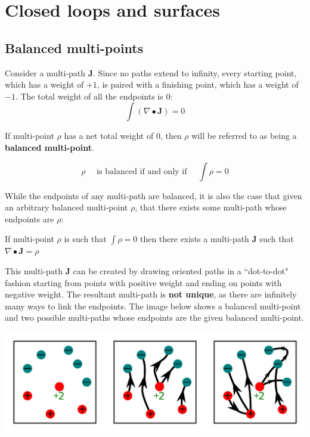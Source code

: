 



\chapter{Closed loops and surfaces}\label{chap:closed_loops_and_surfaces}

\section{Balanced multi-points}\label{sec:balanced_multi-points}

Consider a multi-path \(\mathbf{J}\). Since no paths extend to infinity, every starting point, which has a weight of \(+1\), is paired with a finishing point, which has a weight of \(-1\). The total weight of all the endpoints is \(0\):
\[\int (\nabla \bullet \mathbf{J}) = 0\]

If multi-point \(\rho\) has a net total weight of \(0\), then \(\rho\) will be referred to as being a {\bf balanced multi-point}.

\[\rho \quad\text{ is balanced if and only if }\quad \int \rho = 0\]

While the endpoints of any multi-path are balanced, it is also the case that given an arbitrary balanced multi-point \(\rho\), that there exists some multi-path whose endpoints are \(\rho\):

\begin{thm}\label{thm:dot-to-dot}
If multi-point \(\rho\) is such that \(\int \rho = 0\) then there exists a multi-path \(\mathbf{J}\) such that \(\nabla \bullet \mathbf{J} = \rho\)
\end{thm}

This multi-path \(\mathbf{J}\) can be created by drawing oriented paths in a ``dot-to-dot" fashion starting from points with positive weight and ending on points with negative weight. The resultant multi-path is {\bf not unique}, as there are infinitely many ways to link the endpoints. The image below shows a balanced multi-point and two possible multi-paths whose endpoints are the given balanced multi-point. 

\begin{center}
\includegraphics[width = \textwidth]{Boundaries/Path_endpoints/dot-to-dot}
\end{center}




